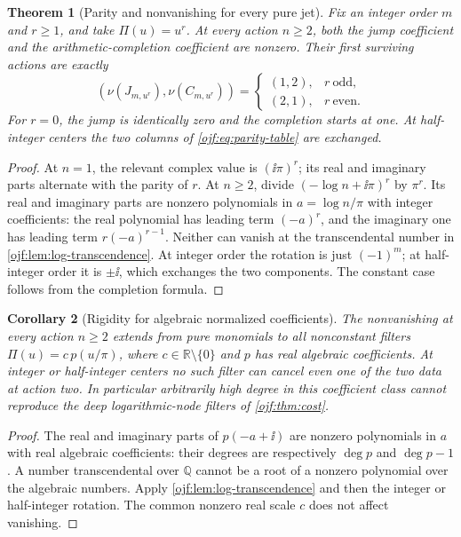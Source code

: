 \documentclass[11pt,a4paper]{article}
\numberwithin{equation}{section}
\newtheorem{theorem}{Theorem}[section]
\newtheorem{corollary}[theorem]{Corollary}
\theoremstyle{definition}\newtheorem{definition}[theorem]{Definition}
\theoremstyle{remark}\newtheorem{remark}[theorem]{Remark}
\newcommand{\Q}{\mathbb Q}\newcommand{\C}{\mathbb C}\newcommand{\R}{\mathbb R}\newcommand{\N}{\mathbb N}
\begin{document}
\begin{theorem}[Parity and nonvanishing for every pure jet]
\label{ojf:thm:parity}
Fix an integer order $m$ and $r\ge1$, and take $\Pi(u)=u^r$.
At every action $n\ge2$, both the jump coefficient and the
arithmetic-completion coefficient are nonzero. Their first surviving
actions are exactly
\begin{equation}\label{ojf:eq:parity-table}
 (\nu(J_{m,u^r}),\nu(C_{m,u^r}))=
 \begin{cases}(1,2),&r\ \text{odd},\\(2,1),&r\ \text{even}.
 \end{cases}
\end{equation}
For $r=0$, the jump is identically zero and the completion starts at
one. At half-integer centers the two columns of
\eqref{ojf:eq:parity-table} are exchanged.
\end{theorem}
\begin{proof}
At $n=1$, the relevant complex value is $(\ii\pi)^r$; its real and
imaginary parts alternate with the parity of $r$. At $n\ge2$, divide
$(-\log n+\ii\pi)^r$ by $\pi^r$. Its real and imaginary parts are
nonzero polynomials in $a=\log n/\pi$ with integer coefficients:
the real polynomial has leading term $(-a)^r$, and the imaginary one
has leading term $r(-a)^{r-1}$. Neither can vanish at the transcendental
number in \cref{ojf:lem:log-transcendence}. At integer order the rotation
is just $(-1)^m$; at half-integer order it is $\pm\ii$, which exchanges
the two components. The constant case follows from the completion formula.
\end{proof}

\begin{corollary}[Rigidity for algebraic normalized coefficients]
\label{ojf:cor:algebraic-rigidity}
The nonvanishing at every action $n\ge2$ extends from pure monomials to
all nonconstant filters
$\Pi(u)=c\,p(u/\pi)$, where $c\in\R\setminus\{0\}$ and $p$ has
real algebraic coefficients. At integer or half-integer centers no such
filter can cancel even one of the two data at action two. In particular
arbitrarily high degree in this coefficient class cannot reproduce the
deep logarithmic-node filters of \cref{ojf:thm:cost}.
\end{corollary}
\begin{proof}
The real and imaginary parts of $p(-a+\ii)$ are nonzero polynomials in
$a$ with real algebraic coefficients: their degrees are respectively
$\deg p$ and $\deg p-1$. A number transcendental over $\Q$ cannot be
a root of a nonzero polynomial over the algebraic numbers. Apply
\cref{ojf:lem:log-transcendence} and then the integer or half-integer
rotation. The common nonzero real scale $c$ does not affect vanishing.
\end{proof}
\end{document}
